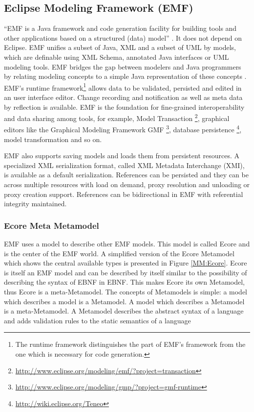 \subsection{Eclipse Modeling Framework (EMF) }
``EMF is a Java framework and code generation facility for building tools and other applications based on a structured (data) model'' \cite{EMFDoc}. 
It does not depend on Eclipse. EMF unifies a subset of Java, XML and a subset of UML by models, which are definable using XML Schema, annotated Java interfaces or UML modeling tools. EMF bridges the gap between modelers and Java programmers by relating modeling concepts to a simple Java representation of these concepts \cite{EMF2nd}.\\

EMF's runtime framework\footnote{\raggedright The runtime framework distinguishes the part of EMF's framework from the one which is necessary for code generation.} allows data to be validated, persisted and edited in an user interface editor. Change recording and notification as well as meta data by reflection is available. EMF is the foundation for fine-grained interoperability and data sharing among tools, for example, Model Transaction \footnote{\raggedright \url{http://www.eclipse.org/modeling/emf/?project=transaction}}, graphical editors like the Graphical Modeling Framework GMF \footnote{\raggedright \url{http://www.eclipse.org/modeling/gmp/?project=gmf-runtime}}, database persistence \footnote{\raggedright \url{http://wiki.eclipse.org/Teneo}}, model transformation and so on.

EMF also supports saving models and loads them from persistent resources. A specialized XML serialization format, called XML Metadata Interchange (XMI), is available as a default serialization. References can be persisted and they can be across multiple resources with load on demand, proxy resolution and unloading or proxy creation support. References can be bidirectional in EMF with referential integrity maintained. \cite{EMF2nd}\\

\subsubsection{Ecore Meta Metamodel} \label{ecore}
EMF uses a model to describe other EMF models. This model is called Ecore and is the center of the EMF world. A simplified version of the Ecore Metamodel which shows the central available types is presented in Figure \ref{MM:Ecore}. Ecore is itself an EMF model and can be described by itself similar to the possibility of describing the syntax of EBNF in EBNF. This makes Ecore its own Metamodel, thus Ecore is a meta-Metamodel. The concepts of Metamodels is simple: a model which describes a model is a Metamodel. A model which describes a Metamodel is a meta-Metamodel. \cite{EMF2nd}  A Metamodel describes the abstract syntax of a language \cite{EMP} and adds validation rules to the static semantics of a language \cite{MDSD}

